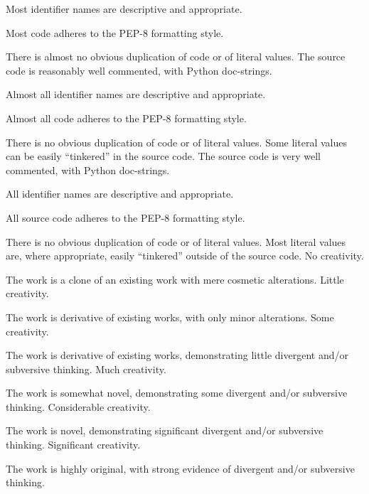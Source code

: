 \documentclass{../../fal_assignment}
\begin{document}
\begin{markingrubric}
            \par Most identifier names are descriptive and appropriate.
            \par Most code adheres to the PEP-8 formatting style.
             \par There is almost no obvious duplication of code or of literal values.   
        \grade The source code is reasonably well commented, with Python doc-strings.
            \par Almost all identifier names are descriptive and appropriate.
            \par Almost all code adheres to the PEP-8 formatting style.
             \par There is no obvious duplication of code or of literal values. Some literal values can be easily ``tinkered'' in the source code. 
        \grade The source code is very well commented, with Python doc-strings.
            \par All identifier names are descriptive and appropriate.
            \par All source code adheres to the PEP-8 formatting style.
             \par There is no obvious duplication of code or of literal values. Most literal values are, where appropriate, easily ``tinkered'' outside of the source code.  
%
        \grade\fail No creativity.
            \par The work is a clone of an existing work with mere cosmetic alterations.
        \grade Little creativity.
            \par The work is derivative of existing works, with only minor alterations.
        \grade Some creativity.
            \par The work is derivative of existing works, demonstrating little divergent and/or subversive thinking.
        \grade Much creativity.
            \par The work is somewhat novel, demonstrating some divergent and/or subversive thinking.
        \grade Considerable creativity.
            \par The work is novel, demonstrating significant divergent and/or subversive thinking.
        \grade Significant creativity.
            \par The work is highly original, with strong evidence of divergent and/or subversive thinking.
%

\end{markingrubric}
\end{document}

